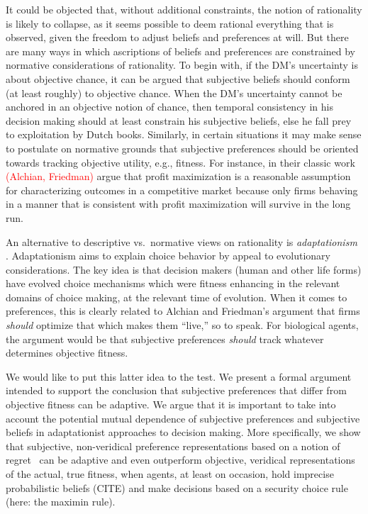 \documentclass[fleqn,reqno,11pt]{article}
\newcommand{\myalert}[1]{\textcolor{red}{#1}}
\begin{document}
It could be objected that, without additional constraints, the notion of rationality is likely
to collapse, as it seems possible to deem rational everything that is observed, given the
freedom to adjust beliefs and preferences at will. But there are many ways in which ascriptions
of beliefs and preferences are constrained by normative considerations of rationality. To begin
with, if the DM's uncertainty is about objective chance, it can be argued that subjective
beliefs should conform (at least roughly) to objective chance. When the DM's uncertainty cannot
be anchored in an objective notion of chance, then temporal consistency in his decision making
should at least constrain his subjective beliefs, else he fall prey to exploitation by Dutch
books. Similarly, in certain situations it may make sense to postulate on normative grounds
that subjective preferences should be oriented towards tracking objective utility, e.g.,
fitness. For instance, in their classic work \myalert{(Alchian, Friedman)} argue that profit
maximization is a reasonable assumption for characterizing outcomes in a competitive market
because only firms behaving in a manner that is consistent with profit maximization will
survive in the long run.

An alternative to descriptive vs.~normative views on rationality is \emph{adaptationism}
\citep[e.g.][]{HagenChater2012:Decision-Making}.  Adaptationism aims to
explain choice behavior by appeal to evolutionary considerations. The key idea is that decision
makers (human and other life forms) have evolved choice mechanisms which were fitness enhancing
in the relevant domains of choice making, at the relevant time of evolution. When it comes to
preferences, this is clearly related to Alchian and Friedman's argument that firms
\emph{should} optimize that which makes them ``live,'' so to speak. For biological agents, the
argument would be that subjective preferences \emph{should} track whatever determines objective
fitness.

We would like to put this latter idea to the test. We present a formal argument intended to
support the conclusion that subjective preferences that differ from objective fitness can be
adaptive. We argue that it is important to take into account the potential mutual dependence of
subjective preferences and subjective beliefs in adaptationist approaches to decision
making. More specifically, we show that subjective, non-veridical preference representations
based on a notion of regret
\citep[e.g.][]{Savage1951:The-theory-of-s,LoomesSugden1982:Regret-Theory:-}\ can be adaptive and even outperform objective, veridical representations of the
actual, true fitness, when agents, at least on occasion, hold imprecise probabilistic beliefs (CITE)
and make decisions based on a security choice rule (here: the maximin rule).
\end{document}
